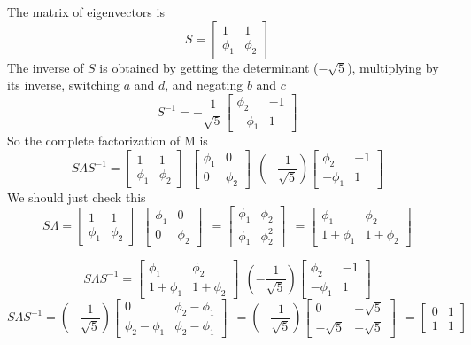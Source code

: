 \documentclass[11pt, oneside]{article}
\begin{document}
The matrix of eigenvectors is 
\[ S = 
\begin{bmatrix} 
  1  &  1 \\ 
  \phi_1  &  \phi_2 
\end{bmatrix} \ \ 
\]
The inverse of $S$ is obtained by getting the determinant ($-\sqrt{5}$), multiplying by its inverse, switching $a$ and $d$, and negating $b$ and $c$
\[ S^{-1} = 
-\frac{1}{\sqrt{5}}
\begin{bmatrix} 
  \phi_2  &  -1 \\ 
  - \phi_1  &  1 
\end{bmatrix} \ \ 
\]
So the complete factorization of M is 
\[ S \Lambda S^{-1} =
\begin{bmatrix} 
  1  &  1 \\ 
  \phi_1  &  \phi_2 
\end{bmatrix} \ \ 
\begin{bmatrix} 
  \phi_1  &  0 \\ 
  0  &  \phi_2 
\end{bmatrix} \ \ 
(-\frac{1}{\sqrt{5}})
\begin{bmatrix} 
  \phi_2  &  -1 \\ 
  -\phi_1  &  1 
\end{bmatrix} \ \ 
\]
We should just check this
\[ S \Lambda =
\begin{bmatrix} 
  1  &  1 \\ 
  \phi_1  &  \phi_2 
\end{bmatrix} \ \ 
\begin{bmatrix} 
  \phi_1  &  0 \\ 
  0  &  \phi_2 
\end{bmatrix} \ \ 
=
\begin{bmatrix} 
  \phi_1  &  \phi_2 \\ 
  \phi_1 & \phi_2^2 
\end{bmatrix} \ \ 
=
\begin{bmatrix} 
  \phi_1  &  \phi_2 \\ 
  1 + \phi_1 & 1 + \phi_2 
\end{bmatrix} \ \ 
\]

\[ S \Lambda S^{-1} =
\begin{bmatrix} 
  \phi_1  &  \phi_2 \\ 
  1 + \phi_1 & 1 + \phi_2 
\end{bmatrix} \ \ 
(-\frac{1}{\sqrt{5}})
\begin{bmatrix} 
  \phi_2  &  -1 \\ 
  -\phi_1  &  1 
\end{bmatrix} \ \ \]
\[
S \Lambda S^{-1} =
(-\frac{1}{\sqrt{5}})
\begin{bmatrix} 
  0  &  \phi_2 - \phi_1 \\ 
  \phi_2 -\phi_1  &  \phi_2 - \phi_1 
\end{bmatrix} \ \ 
=
(-\frac{1}{\sqrt{5}})
\begin{bmatrix} 
  0  &  -\sqrt{5} \\ 
  -\sqrt{5}  &  -\sqrt{5} 
\end{bmatrix} \ \ 
=
\begin{bmatrix} 
  0  &  1 \\ 
  1  &  1 
\end{bmatrix} 
\]
\end{document}
